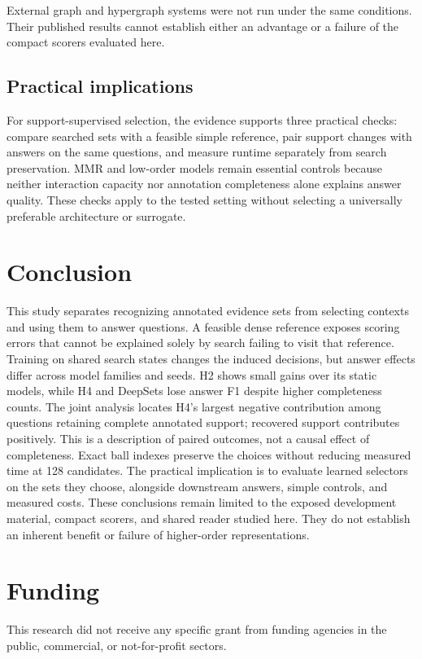 \documentclass[preprint,12pt]{elsarticle}
\begin{document}
External graph and hypergraph systems were not run under the same conditions. Their published results cannot establish either an advantage or a failure of the compact scorers evaluated here.

\subsection{Practical implications}
For support-supervised selection, the evidence supports three practical checks: compare searched sets with a feasible simple reference, pair support changes with answers on the same questions, and measure runtime separately from search preservation. MMR and low-order models remain essential controls because neither interaction capacity nor annotation completeness alone explains answer quality. These checks apply to the tested setting without selecting a universally preferable architecture or surrogate.

\section{Conclusion}
This study separates recognizing annotated evidence sets from selecting contexts and using them to answer questions. A feasible dense reference exposes scoring errors that cannot be explained solely by search failing to visit that reference. Training on shared search states changes the induced decisions, but answer effects differ across model families and seeds. H2 shows small gains over its static models, while H4 and DeepSets lose answer F1 despite higher completeness counts. The joint analysis locates H4's largest negative contribution among questions retaining complete annotated support; recovered support contributes positively. This is a description of paired outcomes, not a causal effect of completeness. Exact ball indexes preserve the choices without reducing measured time at 128 candidates. The practical implication is to evaluate learned selectors on the sets they choose, alongside downstream answers, simple controls, and measured costs. These conclusions remain limited to the exposed development material, compact scorers, and shared reader studied here. They do not establish an inherent benefit or failure of higher-order representations.

\ifdefined\WithAuthors

\fi

\section*{Funding}
This research did not receive any specific grant from funding agencies in the public, commercial, or not-for-profit sectors.
\end{document}

